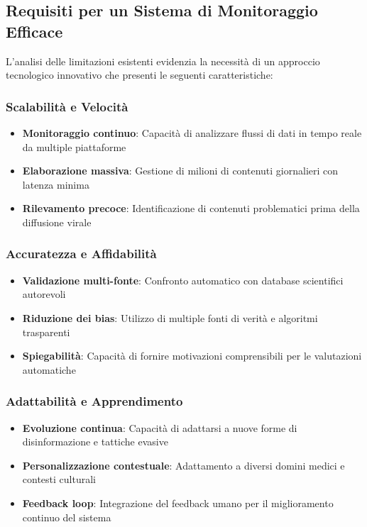 \documentclass[12pt,a4paper]{report}
\begin{document}
\subsection{Requisiti per un Sistema di Monitoraggio Efficace}

L'analisi delle limitazioni esistenti evidenzia la necessità di un approccio tecnologico innovativo che presenti le seguenti caratteristiche:

\subsubsection{Scalabilità e Velocità}

\begin{itemize}
    \item \textbf{Monitoraggio continuo}: Capacità di analizzare flussi di dati in tempo reale da multiple piattaforme
    \item \textbf{Elaborazione massiva}: Gestione di milioni di contenuti giornalieri con latenza minima
    \item \textbf{Rilevamento precoce}: Identificazione di contenuti problematici prima della diffusione virale
\end{itemize}

\subsubsection{Accuratezza e Affidabilità}

\begin{itemize}
    \item \textbf{Validazione multi-fonte}: Confronto automatico con database scientifici autorevoli
    \item \textbf{Riduzione dei bias}: Utilizzo di multiple fonti di verità e algoritmi trasparenti
    \item \textbf{Spiegabilità}: Capacità di fornire motivazioni comprensibili per le valutazioni automatiche
\end{itemize}

\subsubsection{Adattabilità e Apprendimento}

\begin{itemize}
    \item \textbf{Evoluzione continua}: Capacità di adattarsi a nuove forme di disinformazione e tattiche evasive
    \item \textbf{Personalizzazione contestuale}: Adattamento a diversi domini medici e contesti culturali
    \item \textbf{Feedback loop}: Integrazione del feedback umano per il miglioramento continuo del sistema
\end{itemize}
\end{document}
